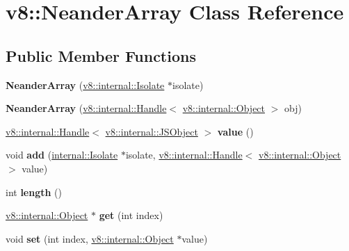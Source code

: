 \hypertarget{classv8_1_1_neander_array}{}\section{v8\+:\+:Neander\+Array Class Reference}
\label{classv8_1_1_neander_array}
\subsection*{Public Member Functions}
\begin{DoxyCompactItemize}
\item 
{\bfseries Neander\+Array} (\hyperlink{classv8_1_1internal_1_1_isolate}{v8\+::internal\+::\+Isolate} $\ast$isolate)\hypertarget{classv8_1_1_neander_array_a605d5d05c8f06ff4d5bd0ace654f1a4a}{}\label{classv8_1_1_neander_array_a605d5d05c8f06ff4d5bd0ace654f1a4a}

\item 
{\bfseries Neander\+Array} (\hyperlink{classv8_1_1internal_1_1_handle}{v8\+::internal\+::\+Handle}$<$ \hyperlink{classv8_1_1internal_1_1_object}{v8\+::internal\+::\+Object} $>$ obj)\hypertarget{classv8_1_1_neander_array_aa01b9315db85062067d067962f1d767f}{}\label{classv8_1_1_neander_array_aa01b9315db85062067d067962f1d767f}

\item 
\hyperlink{classv8_1_1internal_1_1_handle}{v8\+::internal\+::\+Handle}$<$ \hyperlink{classv8_1_1internal_1_1_j_s_object}{v8\+::internal\+::\+J\+S\+Object} $>$ {\bfseries value} ()\hypertarget{classv8_1_1_neander_array_ae370f4d476158c580f93397cdaf2ec55}{}\label{classv8_1_1_neander_array_ae370f4d476158c580f93397cdaf2ec55}

\item 
void {\bfseries add} (\hyperlink{classv8_1_1internal_1_1_isolate}{internal\+::\+Isolate} $\ast$isolate, \hyperlink{classv8_1_1internal_1_1_handle}{v8\+::internal\+::\+Handle}$<$ \hyperlink{classv8_1_1internal_1_1_object}{v8\+::internal\+::\+Object} $>$ value)\hypertarget{classv8_1_1_neander_array_a567ef481f6889f8e04b3bd53e7fc00e9}{}\label{classv8_1_1_neander_array_a567ef481f6889f8e04b3bd53e7fc00e9}

\item 
int {\bfseries length} ()\hypertarget{classv8_1_1_neander_array_a2421d6e75760b2323386c42744c460f6}{}\label{classv8_1_1_neander_array_a2421d6e75760b2323386c42744c460f6}

\item 
\hyperlink{classv8_1_1internal_1_1_object}{v8\+::internal\+::\+Object} $\ast$ {\bfseries get} (int index)\hypertarget{classv8_1_1_neander_array_ab867a17e683aee5fd1405a7463d13f69}{}\label{classv8_1_1_neander_array_ab867a17e683aee5fd1405a7463d13f69}

\item 
void {\bfseries set} (int index, \hyperlink{classv8_1_1internal_1_1_object}{v8\+::internal\+::\+Object} $\ast$value)\hypertarget{classv8_1_1_neander_array_a5fac39905786c26ae25ccf9d82c8f513}{}\label{classv8_1_1_neander_array_a5fac39905786c26ae25ccf9d82c8f513}

\end{DoxyCompactItemize}
